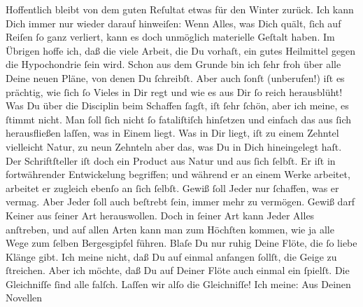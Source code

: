 \begin{ledgroupsized}[t]{13cm}
               Hoffentlich bleibt von dem guten Reſultat etwas für den Winter zurück. \strikeout{\textcolor{gray}{×}} Ich kann Dich immer nur wieder darauf hinweiſen: Wenn Alles, was Dich quält,
               ſich auf Reiſen ſo ganz verliert, kann es doch unmöglich materielle Geſtalt haben. Im
               Übrigen hoffe ich, daß die viele Arbeit, die Du vorhaſt, ein gutes Heilmittel gegen
               die Hypochondrie ſein wird. Schon aus dem Grunde {\pb}bin ich ſehr froh über alle Deine neuen Pläne, von denen Du ſchreibſt. Aber auch
               ſonſt (unberufen!) iſt es prächtig, wie ſich ſo \strikeout{\textcolor{gray}{V}} Vieles in Dir regt und wie es aus Dir ſo reich herausblüht!\pend
           \pstart
           Was Du über die Disciplin beim Schaffen ſagſt, iſt ſehr ſchön, aber ich meine, es
               ſtimmt nicht. Man ſoll ſich nicht ſo fataliſtiſch hinſetzen\strikeout{,} und einfach das aus ſich herausfließen laſſen, was in Einem liegt. Was in
               Dir liegt, iſt zu einem Zehntel vielleicht Natur, zu  neun Zehnteln aber das, was Du in Dich hineingelegt haſt. Der
               Schriftſteller iſt doch ein Product aus Natur und aus ſich ſelbſt. Er iſt in
               fortwährender Entwickelung begriffen; und {\pb}während
               er an einem Werke arbeitet, \strikeout{\textcolor{gray}{×}{ }\textcolor{gray}{arb}} arbeitet er zugleich ebenſo an ſich ſelbſt. Gewiß ſoll Jeder nur ſchaffen, was
               er vermag. Aber Jeder ſoll auch beſtrebt ſein, 
               immer mehr zu vermögen. Gewiß darf Keiner aus ſeiner Art herauswollen. Doch in ſeiner
               Art kann Jeder Alles anſtreben, und auf allen Arten kann man zum Höchſten kommen, wie
                   ja alle Wege zum ſelben Bergesgipfel führen.
               Blaſe Du nur ruhig Deine Flöte, die ſo liebe Klänge gibt. Ich meine  nicht, daß Du auf einmal anfangen ſollſt, die
               Geige zu ſtreichen. Aber ich möchte, daß Du auf Deiner Flöte auch  einmal ein \label{K_L02861-2v}\label{K_L02861-2h} ſpielſt. Die Gleichniſſe ſind alle falſch. Laſſen wir alſo die Gleichniſſe!
               Ich meine: Aus Deinen Novellen

\end{ledgroupsized}
